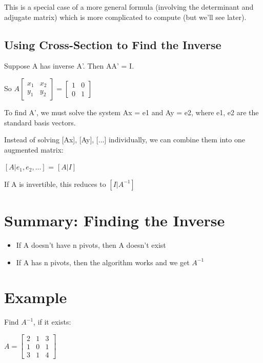 \documentclass[12pt,a4paper]{article}
\begin{document}
This is a special case of a more general formula (involving the determinant and adjugate matrix) which is more complicated to compute (but we'll see later).

\subsection{Using Cross-Section to Find the Inverse}

Suppose A has inverse A'. Then AA' = I.

So $A \begin{bmatrix} x_1 & x_2 \\ y_1 & y_2 \end{bmatrix} = \begin{bmatrix} 1 & 0 \\ 0 & 1 \end{bmatrix}$

To find A', we must solve the system Ax = e1 and Ay = e2, 
where e1, e2 are the standard basis vectors.

Instead of solving [Ax], [Ay], [...] individually, we can combine them into one augmented matrix:

\begin{center}
$[A|e_1, e_2, ...]$ = $[A|I]$
\end{center}

If A is invertible, this reduces to $[I|A^{-1}]$

\section{Summary: Finding the Inverse}

\begin{itemize}
    \item If A doesn't have n pivots, then A doesn't exist
    \item If A has n pivots, then the algorithm works and we get $A^{-1}$
\end{itemize}

\section{Example}

Find $A^{-1}$, if it exists:

\begin{center}
$A = \begin{bmatrix} 2 & 1 & 3 \\ 1 & 0 & 1 \\ 3 & 1 & 4 \end{bmatrix}$
\end{center}
\end{document}

